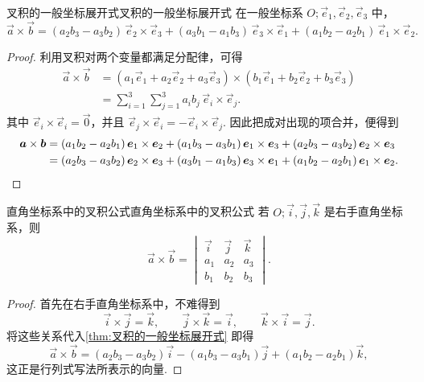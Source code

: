\begin{theorem}{叉积的一般坐标展开式}{叉积的一般坐标展开式}
    在一般坐标系 $O;\vec{e}_1,\vec{e}_2,\vec{e}_3$ 中，
    \[
        \vec{a}\times\vec{b}
        =
        (a_2 b_3 - a_3 b_2)\,\vec{e}_2\times\vec{e}_3
        + (a_3 b_1 - a_1 b_3)\,\vec{e}_3\times\vec{e}_1
        + (a_1 b_2 - a_2 b_1)\,\vec{e}_1\times\vec{e}_2.
    \]
\end{theorem}

\begin{proof}
    利用叉积对两个变量都满足分配律，可得
    \begin{align*}
        \vec{a}\times\vec{b}
         & = (a_1 \vec{e}_1 + a_2 \vec{e}_2 + a_3 \vec{e}_3)\times(b_1 \vec{e}_1 + b_2 \vec{e}_2 + b_3 \vec{e}_3) \\
         & = \sum_{i=1}^3 \sum_{j=1}^3 a_i b_j\, \vec{e}_i \times \vec{e}_j.
    \end{align*}
    其中 $\vec{e}_i \times \vec{e}_i = \vec{0}$，并且 $\vec{e}_j \times \vec{e}_i = - \vec{e}_i \times \vec{e}_j$. 因此把成对出现的项合并，便得到
    \begin{align*}
        \vec{a}\times\vec{b}
         & = (a_1 b_2 - a_2 b_1)\,\vec{e}_1 \times \vec{e}_2
        + (a_1 b_3 - a_3 b_1)\,\vec{e}_1 \times \vec{e}_3
        + (a_2 b_3 - a_3 b_2)\,\vec{e}_2 \times \vec{e}_3 \\
         & = (a_2 b_3 - a_3 b_2)\,\vec{e}_2 \times \vec{e}_3
        + (a_3 b_1 - a_1 b_3)\,\vec{e}_3 \times \vec{e}_1
        + (a_1 b_2 - a_2 b_1)\,\vec{e}_1 \times \vec{e}_2. \qedhere
    \end{align*}
\end{proof}

\begin{corollary}{直角坐标系中的叉积公式}{直角坐标系中的叉积公式}
    若 $O;\vec{i},\vec{j},\vec{k}$ 是右手直角坐标系，则
    \[
        \vec{a}\times\vec{b} =
        \begin{vmatrix}
            \vec{i} & \vec{j} & \vec{k} \\
            a_1     & a_2     & a_3     \\
            b_1     & b_2     & b_3
        \end{vmatrix}.
    \]
\end{corollary}

\begin{proof}
    首先在右手直角坐标系中，不难得到
    \[
        \vec{i}\times\vec{j} = \vec{k},\qquad
        \vec{j}\times\vec{k} = \vec{i},\qquad
        \vec{k}\times\vec{i} = \vec{j}.
    \]
    将这些关系代入\autoref{thm:叉积的一般坐标展开式} 即得
    \[
        \vec{a}\times\vec{b}
        = (a_2 b_3 - a_3 b_2)\vec{i}
        - (a_1 b_3 - a_3 b_1)\vec{j}
        + (a_1 b_2 - a_2 b_1)\vec{k},
    \]
    这正是行列式写法所表示的向量.
\end{proof}

